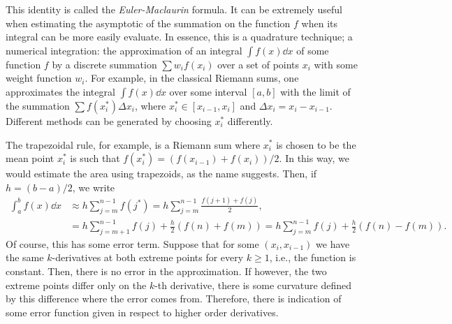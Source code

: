 This identity is called the \textit{Euler-Maclaurin} formula. It can be extremely useful when estimating the asymptotic of the summation on the function $f$ when its integral can be more easily evaluate. In essence, this is a quadrature technique; a numerical integration: the approximation of an integral $\int f(x) \dd x$ of some function $f$ by a discrete summation $\sum w_i f(x_i)$ over a set of points $x_i$ with some weight function $w_i$. For example, in the classical Riemann sums, one approximates the integral $\int f(x) \dd x$ over some interval $[a,b]$ with the limit of the summation $\sum f(x_i^*) \Delta x_i$, where $x_i^* \in [x_{i-1}, x_i]$ and $ \Delta x_i = x_i - x_{i-1}$. Different methods can be generated by choosing $x_i^*$ differently.

The trapezoidal rule, for example, is a Riemann sum where $x_i^*$ is chosen to be the mean point $x_i^*$ is such that $f(x_i^*) = (f(x_{i-1}) + f(x_i))/2$. In this way, we would estimate the area using trapezoids, as the name suggests. Then,  if $h = (b-a)/2$, we write
\begin{align}
	\int_{a}^{b} f(x) \dd x & \approx h \sum_{j = m}^{n-1} f(j^*) = h \sum_{j = m}^{n-1} \frac{f(j+1) + f(j)}{2}, \\
	& = h \sum_{j = m+1}^{n-1} f(j) + \frac{h}{2} \left( f(n) + f(m) \right) = h \sum_{j = m}^{n-1} f(j) + \frac{h}{2} \left( f(n) - f(m) \right) .
\end{align}
Of course, this has some error term. Suppose that for some $(x_i, x_{i-1})$ we have the same $k$-derivatives at both extreme points for every $k\geq 1$, i.e., the function is constant. Then, there is no error in the approximation. If however, the two extreme points differ only on the $k$-th derivative, there is some curvature defined by this difference where the error comes from. Therefore, there is indication of some error function given in respect to higher order derivatives.

